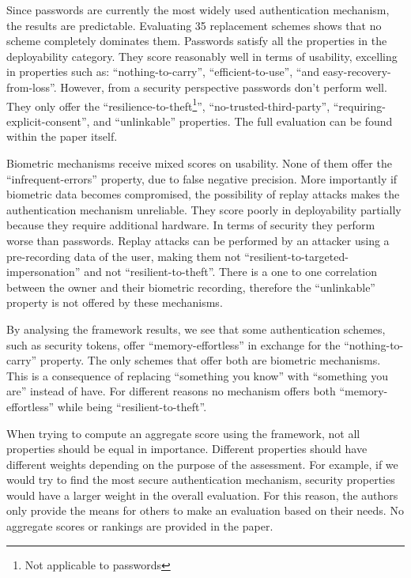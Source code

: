 Since passwords are currently the most widely used authentication mechanism, the results are predictable. Evaluating 35 replacement schemes shows that no scheme completely dominates them. Passwords satisfy all the properties in the deployability category. They score reasonably well in terms of usability, excelling in properties such as: ``nothing-to-carry'', ``efficient-to-use'', ``and easy-recovery-from-loss''. However, from a security perspective passwords don't perform well. They only offer the ``resilience-to-theft\footnote{Not applicable to passwords}'', ``no-trusted-third-party'', ``requiring-explicit-consent'', and ``unlinkable'' properties. The full evaluation can be found within the paper itself.

Biometric mechanisms receive mixed scores on usability. None of them offer the ``infrequent-errors'' property, due to false negative precision. More importantly if biometric data becomes compromised, the possibility of replay attacks makes the authentication mechanism unreliable. They score poorly in deployability partially because they require additional hardware. In terms of security they perform worse than passwords. Replay attacks can be performed by an attacker using a pre-recording data of the user, making them not ``resilient-to-targeted-impersonation'' and not ``resilient-to-theft''. There is a one to one correlation between the owner and their biometric recording, therefore the ``unlinkable'' property is not offered by these mechanisms. 

By analysing the framework results, we see that some authentication schemes, such as security tokens, offer ``memory-effortless'' in exchange for the ``nothing-to-carry'' property.  The only schemes that offer both are biometric mechanisms. This is a consequence of replacing ``something you know'' with ``something you are'' instead of have. For different reasons no mechanism offers both ``memory-effortless'' while being ``resilient-to-theft''.

When trying to compute an aggregate score using the framework, not all properties should be equal in importance. Different properties should have different weights depending on the purpose of the assessment. For example, if we would try to find the most secure authentication mechanism, security properties would have a larger weight in the overall evaluation. For this reason, the authors only provide the means for others to make an evaluation based on their needs. No aggregate scores or rankings are provided in the paper. 

